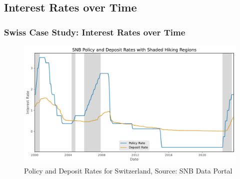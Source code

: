 \documentclass{beamer}
\begin{document}
\subsection{Interest Rates over Time}
\begin{frame}
\frametitle{Swiss Case Study: Interest Rates over Time}
\begin{center}
\begin{minipage}{1\textwidth}
\begin{figure}[H]
    \includegraphics[width=\textwidth]{../../figures/rates_shaded_SNB.pdf}
    \caption{Policy and Deposit Rates for Switzerland, Source: SNB Data Portal \cite{snb2023}}
    \label{fig:rates_shaded}
\end{figure}
\end{minipage}
\end{center}
\end{frame}
\end{document}
